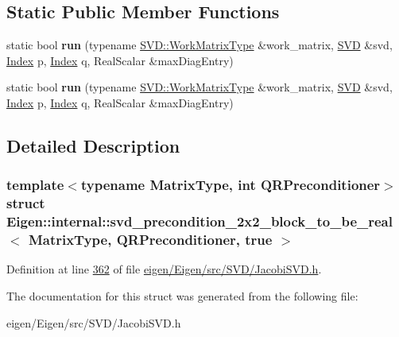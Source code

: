 \subsection*{Static Public Member Functions}
\begin{DoxyCompactItemize}
\item 
\mbox{\label{struct_eigen_1_1internal_1_1svd__precondition__2x2__block__to__be__real_3_01_matrix_type_00_01_qb58fa819a3391e7d55d98ccdc14db9e4_a76a3369c7786e295de41c7061b9da031}} 
static bool {\bfseries run} (typename \hyperlink{group___core___module}{S\+V\+D\+::\+Work\+Matrix\+Type} \&work\+\_\+matrix, \hyperlink{group___s_v_d___module_class_eigen_1_1_jacobi_s_v_d}{S\+VD} \&svd, \hyperlink{namespace_eigen_a62e77e0933482dafde8fe197d9a2cfde}{Index} p, \hyperlink{namespace_eigen_a62e77e0933482dafde8fe197d9a2cfde}{Index} q, Real\+Scalar \&max\+Diag\+Entry)
\item 
\mbox{\label{struct_eigen_1_1internal_1_1svd__precondition__2x2__block__to__be__real_3_01_matrix_type_00_01_qb58fa819a3391e7d55d98ccdc14db9e4_a76a3369c7786e295de41c7061b9da031}} 
static bool {\bfseries run} (typename \hyperlink{group___core___module}{S\+V\+D\+::\+Work\+Matrix\+Type} \&work\+\_\+matrix, \hyperlink{group___s_v_d___module_class_eigen_1_1_jacobi_s_v_d}{S\+VD} \&svd, \hyperlink{namespace_eigen_a62e77e0933482dafde8fe197d9a2cfde}{Index} p, \hyperlink{namespace_eigen_a62e77e0933482dafde8fe197d9a2cfde}{Index} q, Real\+Scalar \&max\+Diag\+Entry)
\end{DoxyCompactItemize}


\subsection{Detailed Description}
\subsubsection*{template$<$typename Matrix\+Type, int Q\+R\+Preconditioner$>$\newline
struct Eigen\+::internal\+::svd\+\_\+precondition\+\_\+2x2\+\_\+block\+\_\+to\+\_\+be\+\_\+real$<$ Matrix\+Type, Q\+R\+Preconditioner, true $>$}



Definition at line \hyperlink{eigen_2_eigen_2src_2_s_v_d_2_jacobi_s_v_d_8h_source_l00362}{362} of file \hyperlink{eigen_2_eigen_2src_2_s_v_d_2_jacobi_s_v_d_8h_source}{eigen/\+Eigen/src/\+S\+V\+D/\+Jacobi\+S\+V\+D.\+h}.



The documentation for this struct was generated from the following file\+:\begin{DoxyCompactItemize}
\item 
eigen/\+Eigen/src/\+S\+V\+D/\+Jacobi\+S\+V\+D.\+h\end{DoxyCompactItemize}
